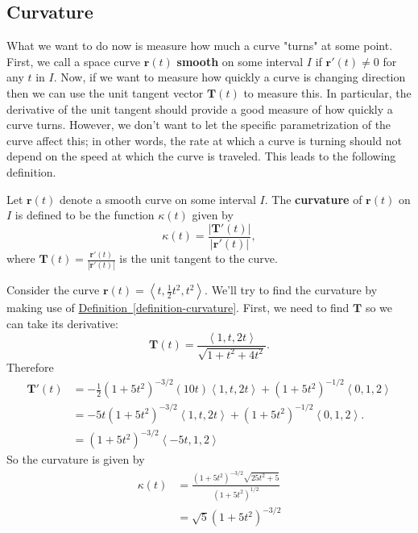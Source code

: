 \documentclass[10pt,]{book}
\newcommand{\terminology}[1]{\textbf{#1}}
\theoremstyle{ptxplainnotitle}
\theoremstyle{ptxplaintitle}
\theoremstyle{ptxplainnotitle}
\theoremstyle{ptxplaintitle}
\theoremstyle{ptxplainnotitle}
\theoremstyle{ptxplaintitle}
\theoremstyle{ptxdefinitionnotitle}
\theoremstyle{ptxdefinitiontitle}
\theoremstyle{ptxdefinitionnotitle}
\theoremstyle{ptxdefinitiontitle}
\theoremstyle{ptxdefinitionnotitle}
\theoremstyle{ptxdefinitiontitle}
\theoremstyle{ptxdefinitionnotitle}
\theoremstyle{ptxdefinitiontitle}
\theoremstyle{ptxdefinitionnotitle}
\theoremstyle{ptxdefinitiontitle}
\numberwithin{equation}{section}
\newcommand{\vv}[1]{\mathbf{#1}}
\newcommand{\dotprod}[1]{\left\langle #1 \right\rangle}
\begin{document}
\subsection[{Curvature}]{Curvature}\label{subsection-curvature}
\hypertarget{p-942}{}%
What we want to do now is measure how much a curve "turns" at some point. First, we call a space curve \(\vv{r}(t)\) \terminology{smooth} on some interval \(I\) if \(\vv{r}'(t)\neq0\) for any \(t\) in \(I\). Now, if we want to measure how quickly a curve is changing direction then we can use the unit tangent vector \(\vv{T}(t)\) to measure this. In particular, the derivative of the unit tangent should provide a good measure of how quickly a curve turns. However, we don't want to let the specific parametrization of the curve affect this; in other words, the rate at which a curve is turning should not depend on the speed at which the curve is traveled. This leads to the following definition.%
\begin{definition}[{Curvature.}]\label{definition-curvature}
\hypertarget{p-943}{}%
Let \(\vv{r}(t)\) denote a smooth curve on some interval \(I\). The \terminology{curvature} of \(\vv{r}(t)\) on \(I\) is defined to be the function \(\kappa(t)\) given by%
%
\begin{equation*}
\kappa(t) = \frac{|\vv{T}'(t)|}{|\vv{r}'(t)|},
\end{equation*}
\hypertarget{p-944}{}%
where \(\vv{T}(t) = \frac{\vv{r}'(t)}{|\vv{r}'(t)|}\) is the unit tangent to the curve.%
\end{definition}
\begin{example}\label{example-computing-a-curvature}
\hypertarget{p-945}{}%
Consider the curve \(\vv{r}(t) = \dotprod{t,\frac{1}{2}t^{2},t^{2}}.\) We'll try to find the curvature by making use of \hyperref[definition-curvature]{Definition~\ref{definition-curvature}}. First, we need to find \(\vv{T}\) so we can take its derivative:%
%
\begin{equation*}
\vv{T}(t) = \frac{\dotprod{1,t,2t}}{\sqrt{1+t^{2}+4t^{2}}}.
\end{equation*}
\hypertarget{p-946}{}%
Therefore%
%
\begin{align*}
\vv{T}'(t) & = -\frac{1}{2}(1+5t^{2})^{-3/2}(10t)\dotprod{1,t,2t} + (1+5t^{2})^{-1/2}\dotprod{0,1,2} \\
& = -5t(1+5t^{2})^{-3/2}\dotprod{1,t,2t} + (1 + 5t^{2})^{-1/2}\dotprod{0,1,2}. \\
& = (1+5t^{2})^{-3/2}\dotprod{-5t,1,2} 
\end{align*}
\hypertarget{p-947}{}%
So the curvature is given by%
%
\begin{align*}
\kappa(t) & = \frac{(1+5t^{2})^{-3/2}\sqrt{25t^{2}+5}}{(1+5t^{2})^{1/2}} \\
& = \sqrt{5}(1+5t^{2})^{-3/2} 
\end{align*}
\end{example}
\end{document}
